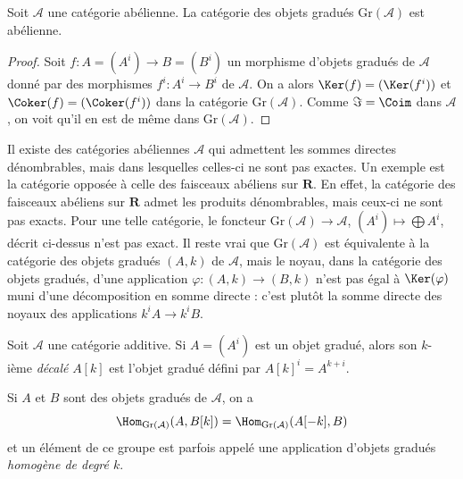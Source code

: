 \begin{lemma}
\label{lemma-graded}
Soit $\mathcal{A}$ une catégorie abélienne. La catégorie des objets gradués
$\text{Gr}(\mathcal{A})$ est abélienne.
\end{lemma}

\begin{proof}
Soit $f : A = (A^i) \to B = (B^i)$ un morphisme d'objets gradués
de $\mathcal{A}$ donné par des
morphismes $f^i : A^i \to B^i$ de $\mathcal{A}$.
On a alors $\Ker(f) = (\Ker(f^i))$ et $\Coker(f) = (\Coker(f^i))$
dans la catégorie $\text{Gr}(\mathcal{A})$.
Comme $\Im = \Coim$ dans $\mathcal{A}$,
on voit qu'il en est de même dans $\text{Gr}(\mathcal{A})$.
\end{proof}

\begin{remark}[Avertissement]
\label{remark-direct-sums-not-exact}
Il existe des catégories abéliennes $\mathcal{A}$ qui admettent les sommes directes
dénombrables, mais dans lesquelles celles-ci ne sont pas exactes. Un exemple
est la catégorie opposée à celle des faisceaux abéliens sur $\mathbf{R}$.
En effet, la catégorie des faisceaux abéliens sur $\mathbf{R}$ admet les
produits dénombrables, mais ceux-ci ne sont pas exacts.
Pour une telle catégorie, le foncteur $\text{Gr}(\mathcal{A}) \to \mathcal{A}$,
$(A^i) \mapsto \bigoplus A^i$,
décrit ci-dessus n'est pas exact. Il reste vrai que
$\text{Gr}(\mathcal{A})$ est équivalente à la catégorie des
objets gradués $(A, k)$ de $\mathcal{A}$, mais le noyau, dans la catégorie
des objets gradués, d'une application $\varphi : (A, k) \to (B, k)$ n'est pas égal à
$\Ker(\varphi)$ muni d'une décomposition en somme directe : c'est plutôt
la somme directe des noyaux des applications $k^iA \to k^iB$.
\end{remark}

\begin{definition}
\label{definition-graded-shift}
Soit $\mathcal{A}$ une catégorie additive. Si $A = (A^i)$ est un objet gradué,
alors son $k$-ième {\it décalé} $A[k]$ est l'objet gradué défini par
$A[k]^i = A^{k + i}$.
\end{definition}

\noindent
Si $A$ et $B$ sont des objets gradués de $\mathcal{A}$, on a
\begin{equation}
\label{equation-hom-into-shift}
\Hom_{\text{Gr}(\mathcal{A})}(A, B[k]) =
\Hom_{\text{Gr}(\mathcal{A})}(A[-k], B)
\end{equation}
et un élément de ce groupe est parfois appelé une application d'objets gradués
{\it homogène de degré $k$}.

